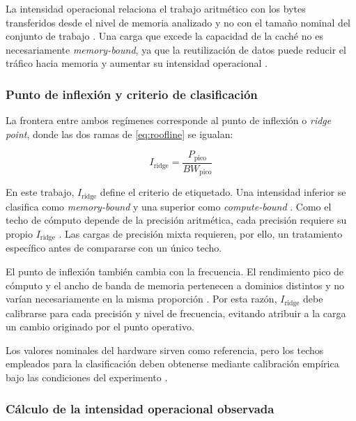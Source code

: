 La intensidad operacional relaciona el trabajo aritmético con los bytes
transferidos desde el nivel de memoria analizado y no con el tamaño nominal del
conjunto de trabajo \cite[p.~66]{Williams2009}. Una carga que excede la
capacidad de la caché no es necesariamente \textit{memory-bound}, ya que la
reutilización de datos puede reducir el tráfico hacia memoria y aumentar su
intensidad operacional \cite[Secs.~3--4]{Goto2008}.

\subsubsection{Punto de inflexión y criterio de clasificación}
\label{sec:marco-ridge}

La frontera entre ambos regímenes corresponde al punto de inflexión o
\textit{ridge point}, donde las dos ramas de \eqref{eq:roofline} se igualan:

\begin{equation}
I_{\text{ridge}} =
\frac{P_{\text{pico}}}{BW_{\text{pico}}}
\label{eq:ridge}
\end{equation}

En este trabajo, $I_{\text{ridge}}$ define el criterio de etiquetado. Una
intensidad inferior se clasifica como \textit{memory-bound} y una superior
como \textit{compute-bound} \cite{Williams2009}. Como el techo de cómputo
depende de la precisión aritmética, cada precisión requiere su propio
$I_{\text{ridge}}$ \cite{Antepara2025}. Las cargas de precisión mixta
requieren, por ello, un tratamiento específico antes de compararse con un
único techo.

El punto de inflexión también cambia con la frecuencia. El rendimiento pico de
cómputo y el ancho de banda de memoria pertenecen a dominios distintos y no
varían necesariamente en la misma proporción
\cite{Guerreiro2019,Ali2023}. Por esta razón, $I_{\text{ridge}}$ debe
calibrarse para cada precisión y nivel de frecuencia, evitando atribuir a la
carga un cambio originado por el punto operativo.

Los valores nominales del hardware sirven como referencia, pero los techos
empleados para la clasificación deben obtenerse mediante calibración empírica
bajo las condiciones del experimento \cite{NERSC2026}.

\subsubsection{Cálculo de la intensidad operacional observada}
\label{sec:intensidad}

